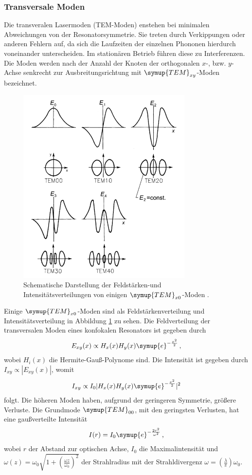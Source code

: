 \subsubsection{Transversale Moden}
Die transveralen Lasermoden (TEM-Moden) enstehen bei minimalen Abweichungen von der Resonatorsymmetrie.
Sie treten durch Verkippungen oder anderen Fehlern auf, da sich die Laufzeiten
der einzelnen Phononen hierdurch voneinander unterscheiden. Im stationären Betrieb
führen diese zu Interferenzen. Die Moden werden nach der Anzahl der Knoten der orthogonalen $x$-, bzw. $y$-Achse senkrecht
zur Ausbreitungsrichtung mit $\symup{TEM}_{xy}$-Moden bezeichnet. 
\begin{figure}
    \centering
    \includegraphics[width = 0.78\textwidth]{pics/Temx.png}
    \caption{Schematische Darstellung der Feldstärken-und Intensitätsverteilungen von einigen $\symup{TEM}_{x0}$-Moden \cite{Laser}.}
    \label{pic:Tem}
\end{figure}
Einige $\symup{TEM}_{x0}$-Moden sind als Feldstärkenverteilung und Intensitätsverteilung in Abbildung \ref{pic:Tem} zu sehen.
Die Feldverteilung der transversalen Moden eines konfokalen Resonators ist gegeben durch
\begin{equation}
    E_{xy}(x) \propto H_x(x) H_y(x) \symup{e}^{-\frac{x^2}{2}} \, \text{,}
\end{equation}
wobei $H_i(x)$ die Hermite-Gauß-Polynome sind. Die Intensität ist gegeben durch $I_{xy} \propto |E_{xy}(x)|$,
womit
\begin{equation}
    I_{xy} \propto I_0 |H_x(x) H_y(x) \symup{e}^{-\frac{x^2}{2}}|^2 
\end{equation}
folgt. Die höheren Moden haben, aufgrund der geringeren Symmetrie, größere Verluste.
Die Grundmode $\symup{TEM}_{00}$, mit den geringsten Verlusten, hat eine gaußverteilte Intensität
\begin{equation}
    I(r) = I_0 \symup{e}^{-\frac{2r^2}{\omega^2}} \, \text{,}
    \label{eqn:tem00}
\end{equation}
wobei $r$ der Abstand zur optischen Achse, $I_0$ die Maximalintensität
und $\omega(z) = \omega_0 \sqrt{1+(\frac{\omega z}{\omega_0})^2}$ der Strahlradius mit der Strahldivergenz $\omega = (\frac{\lambda}{\pi}) \omega_0$.
